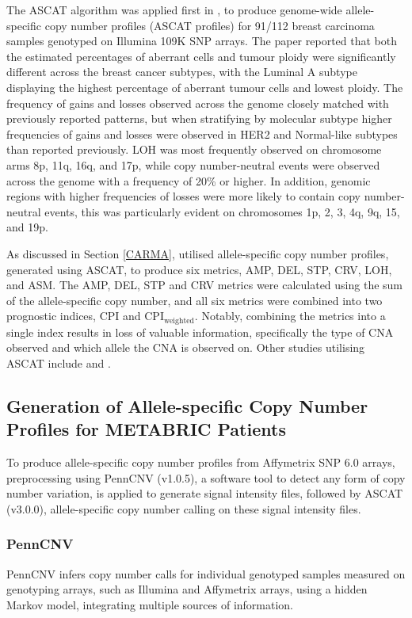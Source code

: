 The ASCAT algorithm was applied first in \cite{pmid20837533}, to produce genome-wide allele-specific copy number profiles (ASCAT profiles) for 91/112 breast carcinoma samples genotyped on Illumina 109K SNP arrays. The paper reported that both the estimated percentages of aberrant cells and tumour ploidy were significantly different across the breast cancer subtypes, with the Luminal A subtype displaying the highest percentage of aberrant tumour cells and lowest ploidy. The frequency of gains and losses observed across the genome closely matched with previously reported patterns, but when stratifying by molecular subtype higher frequencies of gains and losses were observed in HER2 and Normal-like subtypes than reported previously. LOH was most frequently observed on chromosome arms 8p, 11q, 16q, and 17p, while copy number-neutral events were observed across the genome with a frequency of 20\% or higher. In addition, genomic regions with higher frequencies of losses were more likely to contain copy number-neutral events, this was particularly evident on chromosomes 1p, 2, 3, 4q, 9q, 15, and 19p.

As discussed in Section \ref{CARMA}, \cite{pmid32242091} utilised allele-specific copy number profiles, generated using ASCAT, to produce six metrics, AMP, DEL, STP, CRV, LOH, and ASM. The AMP, DEL, STP and CRV metrics were calculated using the sum of the allele-specific copy number, and all six metrics were combined into two prognostic indices, CPI and $\text{CPI}_\text{weighted}$. Notably, combining the metrics into a single index results in loss of valuable information, specifically the type of CNA observed and which allele the CNA is observed on. Other studies utilising ASCAT include \cite{pmid26205786, pmid27161491, pmid35705804, pmid36806386} and \cite{pmid36944408}. 

\subsection{Generation of Allele-specific Copy Number Profiles for METABRIC Patients}
To produce allele-specific copy number profiles from Affymetrix SNP 6.0 arrays, preprocessing using PennCNV (v1.0.5), a software tool to detect any form of copy number variation, is applied to generate signal intensity files, followed by ASCAT (v3.0.0), allele-specific copy number calling on these signal intensity files.

\subsubsection{PennCNV}
PennCNV \citep{pmid17921354} infers copy number calls for individual genotyped samples measured on genotyping arrays, such as Illumina and Affymetrix arrays, using a hidden Markov model, integrating multiple sources of information. 

